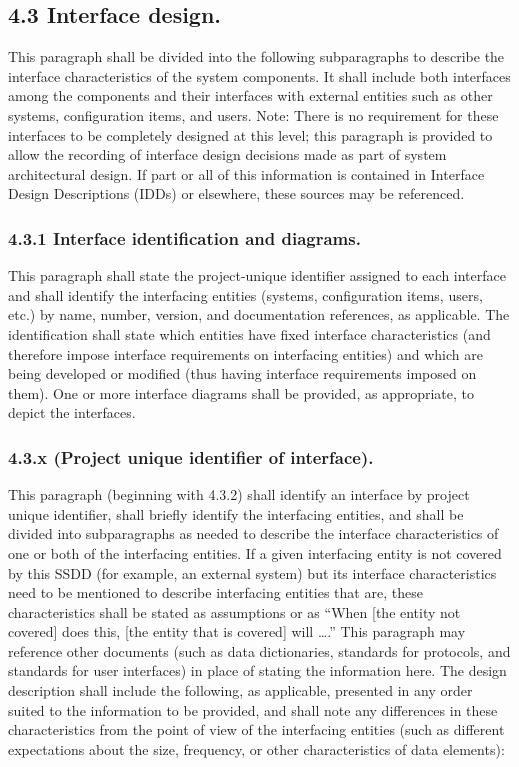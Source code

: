\subsection{4.3 Interface design.}

This paragraph shall be divided into the following subparagraphs to
describe the interface characteristics of the system components. It
shall include both interfaces among the components and their interfaces
with external entities such as other systems, configuration items, and
users. Note: There is no requirement for these interfaces to be
completely designed at this level; this paragraph is provided to allow
the recording of interface design decisions made as part of system
architectural design. If part or all of this information is contained in
Interface Design Descriptions (IDDs) or elsewhere, these sources may be
referenced.

\subsubsection{4.3.1 Interface identification and diagrams.}

This paragraph shall state the project-unique identifier assigned to
each interface and shall identify the interfacing entities (systems,
configuration items, users, etc.) by name, number, version, and
documentation references, as applicable. The identification shall state
which entities have fixed interface characteristics (and therefore
impose interface requirements on interfacing entities) and which are
being developed or modified (thus having interface requirements imposed
on them). One or more interface diagrams shall be provided, as
appropriate, to depict the interfaces.

\subsubsection{4.3.x (Project unique identifier of interface).}

This paragraph (beginning with 4.3.2) shall identify an interface by
project unique identifier, shall briefly identify the interfacing
entities, and shall be divided into subparagraphs as needed to describe
the interface characteristics of one or both of the interfacing
entities. If a given interfacing entity is not covered by this SSDD (for
example, an external system) but its interface characteristics need to
be mentioned to describe interfacing entities that are, these
characteristics shall be stated as assumptions or as ``When {[}the
entity not covered{]} does this, {[}the entity that is covered{]} will
\ldots{}.'' This paragraph may reference other documents (such as data
dictionaries, standards for protocols, and standards for user
interfaces) in place of stating the information here. The design
description shall include the following, as applicable, presented in any
order suited to the information to be provided, and shall note any
differences in these characteristics from the point of view of the
interfacing entities (such as different expectations about the size,
frequency, or other characteristics of data elements):

